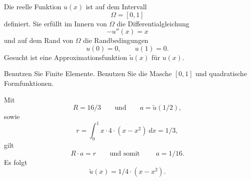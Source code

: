Die reelle Funktion $u(x)$ ist auf dem Intervall
\[
\Omega = [0, 1]
\]
definiert. Sie erfüllt im Innern von $\Omega$ die Differentialgleichung 
\[
- u''(x) = x
\]
und auf dem Rand von $\Omega$ die Randbedingungen 
\[
u(0) = 0, \qquad u(1) = 0.
\]
Gesucht ist eine Approximationsfunktion $\tilde u(x)$ für $u(x)$.

\vspace{2mm}

Benutzen Sie Finite Elemente. Benutzen Sie die Masche $[0,1]$ und quadratische Formfunktionen.

\begin{loesung}

Mit
\[
R = 16/3 \qquad \text{und}  \qquad a = \tilde u(1/2), 
\]
sowie
\[
r = \int_0^1 x \cdot 4 \cdot (x - x^2) \ dx = 1/3,
\]
gilt  
\[
R \cdot a = r  \qquad \text{und somit }  \qquad a = 1/16.
\]
Es folgt 
\[
\tilde u(x) = 1/4 \cdot (x - x^2).
\]
\end{loesung}

